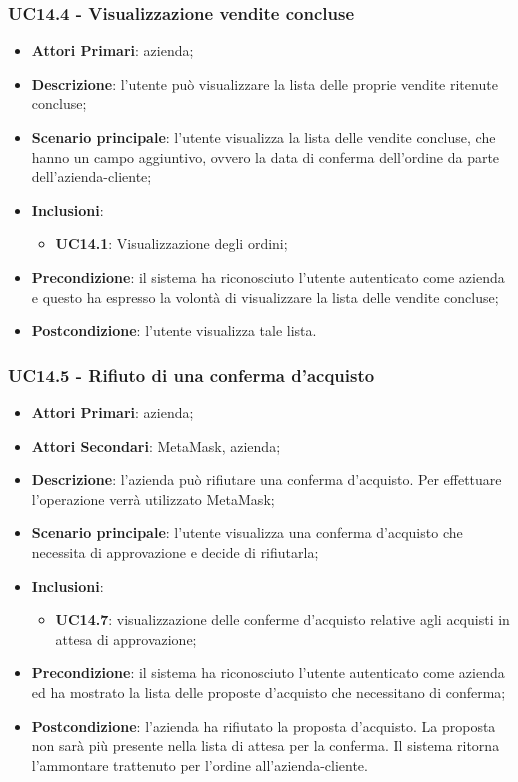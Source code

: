 \subsubsection{UC14.4 - Visualizzazione vendite concluse}
\begin{itemize}
	\item \textbf{Attori Primari}: azienda;
	\item \textbf{Descrizione}: l'utente può visualizzare la lista delle proprie vendite ritenute concluse;
	\item \textbf{Scenario principale}: l'utente visualizza la lista delle vendite concluse, che hanno un campo aggiuntivo, ovvero la data di conferma dell'ordine da parte dell'azienda-cliente;
	\item \textbf{Inclusioni}:
	\begin{itemize}
		\item \textbf{UC14.1}: Visualizzazione degli ordini;
	\end{itemize}
	\item \textbf{Precondizione}: il sistema ha riconosciuto l'utente autenticato come azienda e questo ha espresso la volontà di visualizzare la lista delle vendite concluse;
	\item \textbf{Postcondizione}: l'utente visualizza tale lista.
\end{itemize}


\subsubsection{UC14.5 - Rifiuto di una conferma d'acquisto}
\begin{itemize}
	\item \textbf{Attori Primari}: azienda;
	\item \textbf{Attori Secondari}: MetaMask\glo, azienda;
	\item \textbf{Descrizione}: l'azienda può rifiutare una conferma d'acquisto\glo. Per effettuare l'operazione verrà utilizzato MetaMask\glo;
	\item \textbf{Scenario principale}: l'utente visualizza una conferma d'acquisto che necessita di approvazione e decide di rifiutarla;
	\item \textbf{Inclusioni}: 
	\begin{itemize}
		\item \textbf{UC14.7}: visualizzazione delle conferme d'acquisto relative agli acquisti in attesa di approvazione;
	\end{itemize}
	\item \textbf{Precondizione}: il sistema ha riconosciuto l'utente autenticato come azienda ed ha mostrato la lista delle proposte d'acquisto che necessitano di conferma;
	\item \textbf{Postcondizione}: l'azienda ha rifiutato la proposta d'acquisto. La proposta non sarà più presente nella lista di attesa per la conferma. Il sistema ritorna l'ammontare trattenuto per l'ordine all'azienda-cliente.
\end{itemize}
